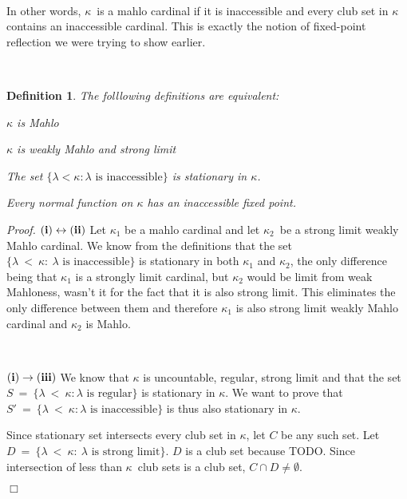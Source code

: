 \documentclass[12pt,a4paper]{article}
\newtheorem{definition}[theorem]{Definition}
\newenvironment{proof}
{\noindent \textit{Proof.}}
{\hspace*{\fill} $\Box$}
\renewcommand{\iff}{\leftrightarrow}
\newcommand{\then}{\rightarrow}
\newcommand{\bce}{\begin{compactenum}}
\newcommand{\ece}{\end{compactenum}}
\begin{document}
\begin{}
\

In other words, $\kappa$ is a mahlo cardinal if it is inaccessible and every club set in $\kappa$ contains an inaccessible cardinal. This is exactly the notion of fixed-point reflection we were trying to show earlier.

\

\cite{DrakeBook}
\begin{definition}{}\label{def:mahlo_equivalent}
The folllowing definitions are equivalent:
\bce[(i)]
\item $\kappa$ is Mahlo
\item $\kappa$ is weakly Mahlo and strong limit
\item The set $\{\lambda < \kappa : \lambda\mbox{ is inaccessible}\}$ is stationary in $\kappa$.
\item Every normal function on $\kappa$ has an inaccessible fixed point.
\ece
\end{definition}

\begin{proof}
$\bold{(i) \iff \bold{(ii)}}$
Let $\kappa_1$ be a mahlo cardinal and let $\kappa_2$ be a strong limit weakly Mahlo cardinal. We know from the definitions that the set $\{\lambda\ <\ \kappa:\ \lambda\mbox{ is inaccessible}\}$ is stationary in both $\kappa_1$ and $\kappa_2$, the only difference being that $\kappa_1$ is a strongly limit cardinal, but $\kappa_2$ would be limit from weak Mahloness, wasn't it for the fact that it is also strong limit. This eliminates the only difference between them and therefore $\kappa_1$ is also strong limit weakly Mahlo cardinal and $\kappa_2$ is Mahlo.

\

$\bold{(i) \then (iii)}$
We know that $\kappa$ is uncountable, regular, strong limit and that the set $S\ =\ \{\lambda\ <\ \kappa: \lambda\mbox{ is regular}\}$ is stationary in $\kappa$. 
We want to prove that $S'\ =\ \{\lambda\ <\ \kappa: \lambda\mbox{ is inaccessible}\}$ is thus also stationary in $\kappa$.

Since stationary set intersects every club set in $\kappa$, let $C$ be any such set. Let $D\ =\ \{ \lambda\ <\ \kappa:\ \lambda\mbox{ is strong limit}\}$. 
$D$ is a club set because TODO.
Since intersection of less than $\kappa$ club sets is a club set, $C \cap D \neq \emptyset$. 


\end{proof}
\end{}
\end{document}
